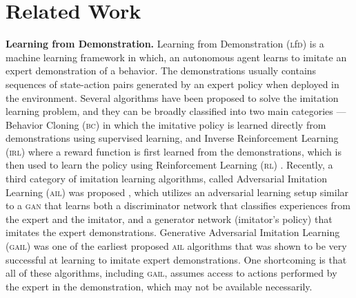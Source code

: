 \documentclass[letterpaper, 10 pt, conference]{ieeeconf}  %
\newcommand{\gail}{\textsc{gail}}
\newcommand{\bc}{\textsc{bc}}
\newcommand{\irl}{\textsc{irl}}
\newcommand{\rl}{\textsc{rl}}
\newcommand{\ail}{\textsc{ail}}
\newcommand{\gan}{\textsc{gan}}
\newcommand{\lfd}{\textsc{l}f\textsc{d}}
\begin{document}

\section{Related Work}
\label{sec:relatedwork}


\textbf{Learning from Demonstration.} Learning from Demonstration (\lfd{}) is a machine learning framework in which, an autonomous agent learns to imitate an expert demonstration of a behavior. The demonstrations usually contains sequences of state-action pairs 
generated by an expert policy when deployed in the environment. Several algorithms have been proposed to solve the imitation learning problem, and they can be broadly classified into two main categories \cite{gaifo_proprio}---Behavior Cloning (\bc{}) \cite{bainandsommut, ross2011, daftry2016} in which the imitative policy is learned directly from demonstrations using supervised learning, and Inverse Reinforcement Learning (\irl{}) \cite{apprenticeship, bagnell, bakerAU} where a reward function is first learned from the demonstrations, which is then used to learn the policy using Reinforcement Learning (\rl{}) \cite{suttonandbarto}.
Recently, a third category of imitation learning algorithms, called Adversarial Imitation Learning (\ail{}) was proposed \cite{gail, valuedice, pwil}, which utilizes an adversarial learning setup similar to a \gan{} \cite{gan} that learns both a discriminator network that classifies experiences from the expert and the imitator, and a generator network (imitator's policy) that imitates the expert demonstrations.  Generative Adversarial Imitation Learning (\gail{}) \cite{gail} was one of the earliest proposed \ail{} algorithms that was shown to be very successful at learning to imitate expert demonstrations. One shortcoming is that all of these algorithms, including \gail{}, assumes access to actions performed by the expert in the demonstration, which may not be available necessarily.
\end{document}

